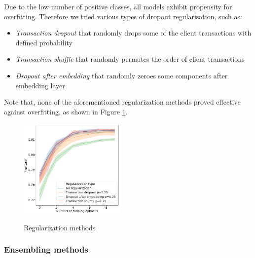 \documentclass[sigconf]{acmart}
\begin{document}
Due to the low number of positive classes, all models exhibit propensity for overfitting. Therefore we tried various types of dropout regularisation, such as:
\begin{itemize}
\item \textit{Transaction dropout} that randomly drops some of the client transactions with defined probability
\item \textit{Transaction shuffle} that randomly permutes the order of client transactions
\item \textit{Dropout after embedding} that randomly zeroes some components after embedding layer
\end{itemize}
Note that, none of the aforementioned regularization methods proved effective against overfitting, as shown in Figure \ref{fig-reg}.

\begin{figure}[ht]
  \caption{Regularization methods}
  \includegraphics[width=0.46\textwidth]{figures/do-pic.png}
  \label{fig-reg}
\end{figure}


\subsubsection{Ensembling methods} \label{sec-ens}
\end{document}

